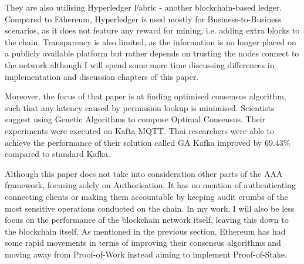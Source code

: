 They are also utilising Hyperledger Fabric - another blockchain-based ledger. Compared to Ethereum, Hyperledger \cite{cachin2016architecture} is used mostly for Business-to-Business scenarios, as it does not feature any reward for mining, i.e. adding extra blocks to the chain. Transparency is also limited, as the information is no longer placed on a publicly available platform but rather depends on trusting the nodes connect to the network although I will spend some more time discussing differences in implementation and discussion chapters of this paper.

Moreover, the focus of that paper is at finding optimised consensus algorithm, such that any latency caused by permission lookup is minimised. Scientists suggest using Genetic Algorithms to compose Optimal Consensus. Their experiments were executed on Kafta MQTT\cite{waehner_2019}. Thai researchers were able to achieve the performance of their solution called GA Kafka improved by 69.43\% compared to standard Kafka.

Although this paper does not take into consideration other parts of the AAA framework, focusing solely on Authorisation. It has no mention of authenticating connecting clients or making them accountable by keeping audit crumbs of the most sensitive operations conducted on the chain. In my work, I will also be less focus on the performance of the blockchain network itself, leaving this down to the blockchain itself. As mentioned in the previous section, Ethereum has had some rapid movements in terms of improving their consensus algorithms and moving away from Proof-of-Work instead aiming to implement Proof-of-Stake.
